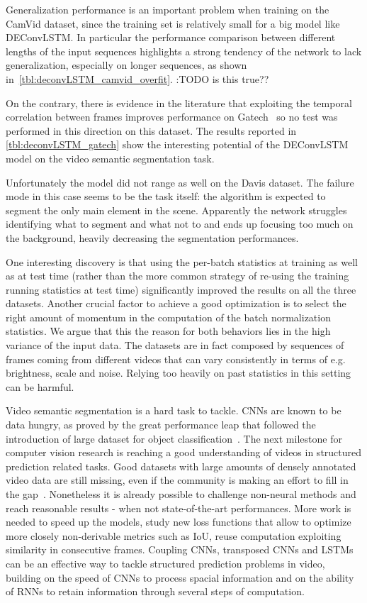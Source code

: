 Generalization performance is an important problem when training on the CamVid
dataset, since the training set is relatively small for a big model like
DEConvLSTM. In particular the performance comparison between different lengths
of the input sequences highlights a strong tendency of the network to lack
generalization, especially on longer sequences, as shown
in~\autoref{tbl:deconvLSTM_camvid_overfit}. :TODO is this true??

On the contrary, there is evidence in the literature that exploiting the
temporal correlation between frames improves performance on Gatech~\cite{
Tran16v2v} so no test was performed in this direction on this dataset. The
results reported in \autoref{tbl:deconvLSTM_gatech} show the interesting
potential of the DEConvLSTM model on the video semantic segmentation task.

Unfortunately the model did not range as well on the Davis dataset. The failure
mode in this case seems to be the task itself: the algorithm is expected to
segment the only main element in the scene. Apparently the network struggles
identifying what to segment and what not to and ends up focusing too much on
the background, heavily decreasing the segmentation performances.

One interesting discovery is that using the per-batch statistics at training as
well as at test time (rather than the more common strategy of re-using the
training running statistics at test time) significantly improved the results on
all the three datasets. Another crucial factor to achieve a good optimization
is to select the right amount of momentum in the computation of the batch
normalization statistics. We argue that this the reason for both behaviors lies
in the high variance of the input data. The datasets are in fact composed by
sequences of frames coming from different videos that can vary consistently in
terms of e.g. brightness, scale and noise. Relying too heavily on past
statistics in this setting can be harmful.

Video semantic segmentation is a hard task to tackle. CNNs are known to be
data hungry, as proved by the great performance leap that followed the
introduction of large dataset for object classification~\citep{ILSVRCarxiv14}.
The next milestone for computer vision research is reaching a good
understanding of videos in structured prediction related tasks. Good datasets
with large amounts of densely annotated video data are still missing, even if
the community is making an effort to fill in the gap~\citep[see~e.g.,~][]{
Perazzi2016}. Nonetheless it is already possible to challenge non-neural
methods and reach reasonable results - when not state-of-the-art performances.
More work is needed to speed up the models, study new loss functions that allow
to optimize more closely non-derivable metrics such as IoU, reuse computation
exploiting similarity in consecutive frames. Coupling CNNs, transposed CNNs
and LSTMs can be an effective way to tackle structured prediction problems in
video, building on the speed of CNNs to process spacial information and on the
ability of RNNs to retain information through several steps of computation.


